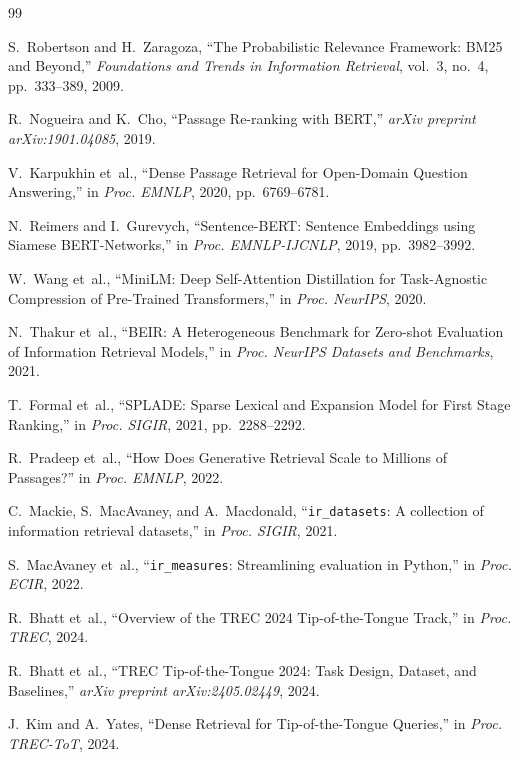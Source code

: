 \documentclass[conference]{IEEEtran}
\begin{document}
\begin{thebibliography}{99}

S.~Robertson and H.~Zaragoza,
``The Probabilistic Relevance Framework: BM25 and Beyond,''
\textit{Foundations and Trends in Information Retrieval},
vol.~3, no.~4, pp.~333--389, 2009.

R.~Nogueira and K.~Cho,
``Passage Re-ranking with BERT,''
\textit{arXiv preprint arXiv:1901.04085}, 2019.

V.~Karpukhin et~al.,
``Dense Passage Retrieval for Open-Domain Question Answering,''
in \textit{Proc. EMNLP}, 2020, pp.~6769--6781.

N.~Reimers and I.~Gurevych,
``Sentence-BERT: Sentence Embeddings using Siamese BERT-Networks,''
in \textit{Proc. EMNLP-IJCNLP}, 2019, pp.~3982--3992.

W.~Wang et~al.,
``MiniLM: Deep Self-Attention Distillation for Task-Agnostic Compression
of Pre-Trained Transformers,''
in \textit{Proc. NeurIPS}, 2020.

N.~Thakur et~al.,
``BEIR: A Heterogeneous Benchmark for Zero-shot Evaluation of Information
Retrieval Models,''
in \textit{Proc. NeurIPS Datasets and Benchmarks}, 2021.

T.~Formal et~al.,
``SPLADE: Sparse Lexical and Expansion Model for First Stage Ranking,''
in \textit{Proc. SIGIR}, 2021, pp.~2288--2292.

R.~Pradeep et~al.,
``How Does Generative Retrieval Scale to Millions of Passages?''
in \textit{Proc. EMNLP}, 2022.

C.~Mackie, S.~MacAvaney, and A.~Macdonald,
``\texttt{ir\_datasets}: A collection of information retrieval datasets,''
in \textit{Proc. SIGIR}, 2021.

S.~MacAvaney et~al.,
``\texttt{ir\_measures}: Streamlining evaluation in Python,''
in \textit{Proc. ECIR}, 2022.

R.~Bhatt et~al.,
``Overview of the TREC 2024 Tip-of-the-Tongue Track,''
in \textit{Proc. TREC}, 2024.

R.~Bhatt et~al.,
``TREC Tip-of-the-Tongue 2024: Task Design, Dataset, and Baselines,''
\textit{arXiv preprint arXiv:2405.02449}, 2024.

J.~Kim and A.~Yates,
``Dense Retrieval for Tip-of-the-Tongue Queries,''
in \textit{Proc. TREC-ToT}, 2024.

\end{thebibliography}
\end{document}
